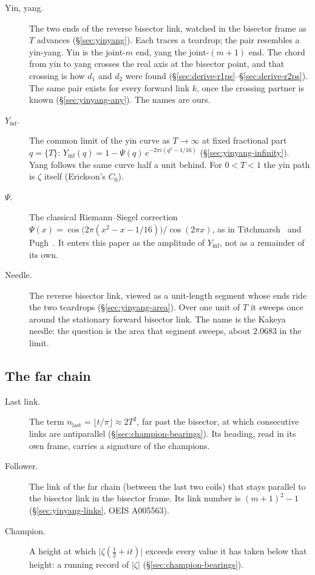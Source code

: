 \documentclass[11pt]{article}
\theoremstyle{definition}
\begin{document}
\begin{description}
\item[Yin, yang.]
The two ends of the reverse bisector link, watched in the
bisector frame as $T$ advances
(\S\ref{sec:yinyang}).
Each traces a teardrop; the pair resembles a yin-yang.
Yin is the joint-$m$ end, yang the joint-$(m+1)$ end.
The chord from yin to yang crosses the real axis at the bisector
point, and that crossing is how $d_1$ and $d_2$ were found
(\S\ref{sec:derive-r1ps}--\S\ref{sec:derive-r2ps}).
The same pair exists for every forward link $k$, once the crossing
partner is known (\S\ref{sec:yinyang-any}).
The names are ours.

\item[$Y_{\inf}$.]
The common limit of the yin curve as $T\to\infty$ at fixed
fractional part $q=\{T\}$:
$Y_{\inf}(q)=1-\Psi(q)\,e^{-2\pi i(q^{2}-1/16)}$
(\S\ref{sec:yinyang-infinity}).
Yang follows the same curve half a unit behind.
For $0<T<1$ the yin path is $\zeta$ itself (Erickson's $C_0$).

\item[$\Psi$.]
The classical Riemann--Siegel correction
$\Psi(x)=\cos\bigl(2\pi(x^{2}-x-1/16)\bigr)/\cos(2\pi x)$,
as in Titchmarsh~\cite[\S15.3]{Titchmarsh1986} and
Pugh~\cite[\S5.4.1]{Pugh1998}.
It enters this paper as the amplitude of $Y_{\inf}$, not as a
remainder of its own.

\item[Needle.]
The reverse bisector link, viewed as a unit-length segment whose
ends ride the two teardrops
(\S\ref{sec:yinyang-area}).
Over one unit of $T$ it sweeps once around the stationary forward
bisector link.
The name is the Kakeya needle: the question is the area that
segment sweeps, about $2.0683$ in the limit.
\end{description}

\subsection*{The far chain}

\begin{description}
\item[Last link.]
The term $n_{\mathrm{last}}=\lfloor t/\pi\rfloor\approx 2T^{2}$,
far past the bisector, at which consecutive links are
antiparallel (\S\ref{sec:champion-bearings}).
Its heading, read in its own frame, carries a signature of the
champions.

\item[Follower.]
The link of the far chain (between the last two coils) that stays
parallel to the bisector link in the bisector frame.
Its link number is $(m+1)^{2}-1$
(\S\ref{sec:yinyang-links}, OEIS A005563).

\item[Champion.]
A height at which $\bigl|\zeta(\tfrac12+it)\bigr|$ exceeds every
value it has taken below that height: a running record of
$|\zeta|$ (\S\ref{sec:champion-bearings}).
\end{description}
\end{document}
